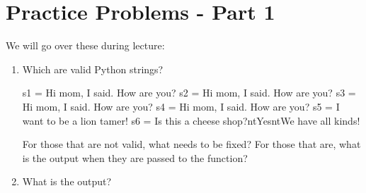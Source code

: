 \documentclass[letterpaper,10pt,english]{sphinxmanual}
\begin{document}
\section{Practice Problems - Part 1}
\label{\detokenize{lecture_notes/lec03_strings:practice-problems-part-1}}
We will go over these during lecture:
\begin{enumerate}
\def\theenumi{\arabic{enumi}}
\def\labelenumi{\theenumi .}
\makeatletter\def\p@enumii{\p@enumi \theenumi .}\makeatother
\item {} 
Which are valid Python strings?

\begin{sphinxVerbatim}[commandchars=\\\{\}]
\PYGZgt{}\PYGZgt{}\PYGZgt{} s1 = \PYGZsq{}\PYGZdq{}Hi mom\PYGZdq{}, I said.  \PYGZdq{}How are you?\PYGZdq{}\PYGZsq{}
\PYGZgt{}\PYGZgt{}\PYGZgt{} s2 = \PYGZsq{}\PYGZdq{}Hi mom\PYGZdq{}, I said.  \PYGZsq{}\PYGZdq{}How are you?\PYGZdq{}
\PYGZgt{}\PYGZgt{}\PYGZgt{} s3 = \PYGZsq{}\PYGZdq{}Hi mom\PYGZdq{}, I said.  \PYGZsq{}\PYGZdq{}How are you?\PYGZdq{}\PYGZsq{}
\PYGZgt{}\PYGZgt{}\PYGZgt{} s4 = \PYGZdq{}\PYGZdq{}\PYGZdq{}\PYGZsq{}Hi mom\PYGZdq{}, I said.  \PYGZsq{}\PYGZdq{}How are you?\PYGZdq{}\PYGZsq{}\PYGZdq{}\PYGZdq{}\PYGZdq{}
\PYGZgt{}\PYGZgt{}\PYGZgt{} s5 = \PYGZdq{}\PYGZdq{}I want to be a lion tamer!\PYGZdq{}\PYGZsq{}
\PYGZgt{}\PYGZgt{}\PYGZgt{} s6 = \PYGZdq{}\PYGZbs{}\PYGZdq{}Is this a cheese shop?\PYGZbs{}\PYGZdq{}\PYGZbs{}n\PYGZbs{}t\PYGZsq{}Yes\PYGZsq{}\PYGZbs{}n\PYGZbs{}t\PYGZbs{}\PYGZdq{}We have all kinds!\PYGZbs{}\PYGZdq{}\PYGZdq{}
\end{sphinxVerbatim}

For those that are not valid, what needs to be fixed?  For those
that are, what is the output when they are passed to the 
function?

\item {} 
What is the output?

\begin{sphinxVerbatim}[commandchars=\\\{\}]
  
\end{sphinxVerbatim}


\end{enumerate}
\end{document}
